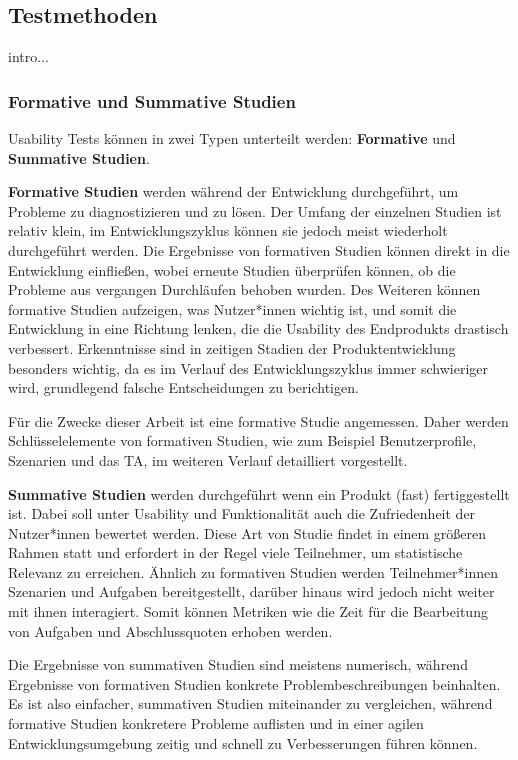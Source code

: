 
\subsection{Testmethoden}
intro...
\subsubsection{Formative und Summative Studien}
\label{section:formative-summative}
Usability Tests können in zwei Typen unterteilt werden: \textbf{Formative} und \textbf{Summative Studien}.

\textbf{Formative Studien} werden während der Entwicklung durchgeführt, um Probleme zu diagnostizieren und zu lösen. Der Umfang der einzelnen Studien ist relativ klein, im Entwicklungszyklus können sie jedoch meist wiederholt durchgeführt werden. Die Ergebnisse von formativen Studien können direkt in die Entwicklung einfließen, wobei erneute Studien überprüfen können, ob die Probleme aus vergangen Durchläufen behoben wurden. Des Weiteren können formative Studien aufzeigen, was Nutzer*innen wichtig ist, und somit die Entwicklung in eine Richtung lenken, die die Usability des Endprodukts drastisch verbessert. Erkenntnisse sind in zeitigen Stadien der Produktentwicklung besonders wichtig, da es im Verlauf des Entwicklungszyklus immer schwieriger wird, grundlegend falsche Entscheidungen zu berichtigen.

Für die Zwecke dieser Arbeit ist eine formative Studie angemessen. Daher werden Schlüsselelemente von formativen Studien, wie zum Beispiel Benutzerprofile, Szenarien und das \acl{TA}, im weiteren Verlauf detailliert vorgestellt.

\textbf{Summative Studien} werden durchgeführt wenn ein Produkt (fast) fertiggestellt ist. Dabei soll unter Usability und Funktionalität auch die Zufriedenheit der Nutzer*innen bewertet werden. Diese Art von Studie findet in einem größeren Rahmen statt und erfordert in der Regel viele Teilnehmer, um statistische Relevanz zu erreichen. Ähnlich zu formativen Studien werden Teilnehmer*innen Szenarien und Aufgaben bereitgestellt, darüber hinaus wird jedoch nicht weiter mit ihnen interagiert. Somit können Metriken wie die Zeit für die Bearbeitung von Aufgaben und Abschlussquoten erhoben werden.

Die Ergebnisse von summativen Studien sind meistens numerisch, während Ergebnisse von formativen Studien konkrete Problembeschreibungen beinhalten. Es ist also einfacher, summativen Studien miteinander zu vergleichen, während formative Studien konkretere Probleme auflisten und in einer agilen Entwicklungsumgebung zeitig und schnell zu Verbesserungen führen können.

